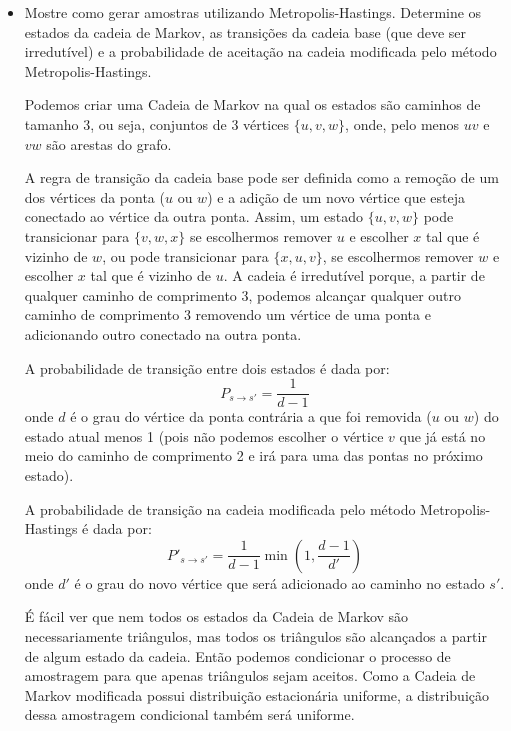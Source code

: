 \begin{itemize}
  \item Mostre como gerar amostras utilizando Metropolis-Hastings. Determine os estados da cadeia de Markov, as transições da cadeia base (que deve ser irredutível) e a probabilidade de aceitação na cadeia modificada pelo método Metropolis-Hastings.
  \begin{resposta}
    Podemos criar uma Cadeia de Markov na qual os estados são caminhos de tamanho 3, ou seja, conjuntos de 3 vértices $\{u, v, w\}$, onde, pelo menos $uv$ e $vw$ são arestas do grafo.

    A regra de transição da cadeia base pode ser definida como a remoção de um dos vértices da ponta ($u$ ou $w$) e a adição de um novo vértice que esteja conectado ao vértice da outra ponta. Assim, um estado $\{u, v, w\}$ pode transicionar para $\{v, w, x\}$ se escolhermos remover $u$ e escolher $x$ tal que é vizinho de $w$, ou pode transicionar para $\{x, u, v\}$, se escolhermos remover $w$ e escolher $x$ tal que é vizinho de $u$.
    A cadeia é irredutível porque, a partir de qualquer caminho de comprimento 3, podemos alcançar qualquer outro caminho de comprimento 3 removendo um vértice de uma ponta e adicionando outro conectado na outra ponta.
    
    A probabilidade de transição entre dois estados é dada por:
    $$ P_{s \rightarrow s'} = \frac{1}{d-1} $$
    onde $d$ é o grau do vértice da ponta contrária a que foi removida ($u$ ou $w$) do estado atual menos 1 (pois não podemos escolher o vértice $v$ que já está no meio do caminho de comprimento 2 e irá para uma das pontas no próximo estado).

    A probabilidade de transição na cadeia modificada pelo método Metropolis-Hastings é dada por:
    $$ P'_{s \rightarrow s'} = \frac{1}{d-1} \min\left(1, \frac{d-1}{d'} \right) $$
    onde $d'$ é o grau do novo vértice que será adicionado ao caminho no estado $s'$.

    É fácil ver que nem todos os estados da Cadeia de Markov são necessariamente triângulos, mas todos os triângulos são alcançados a partir de algum estado da cadeia. Então podemos condicionar o processo de amostragem para que apenas triângulos sejam aceitos. Como a Cadeia de Markov modificada possui distribuição estacionária uniforme, a distribuição dessa amostragem condicional também será uniforme.


\end{resposta}
\end{itemize}
